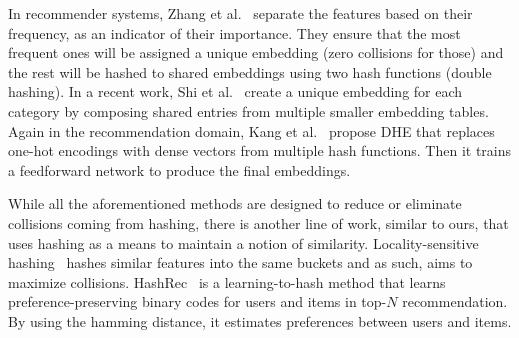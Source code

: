 \documentclass[conference]{IEEEtran}
\begin{document}
In recommender systems, Zhang et al.~\cite{zhang2020model} separate the features based on their frequency, as an indicator of their importance. They ensure that the most frequent ones will be assigned a unique embedding (zero collisions for those) and the rest will be hashed to shared embeddings using two hash functions (double hashing).  
In a recent work, Shi et al.~\cite{shi2020compositional} create a unique embedding for each category by composing shared entries from multiple smaller embedding tables.
% 
Again in the recommendation domain, Kang et al.~\cite{kang2020deep} propose DHE that replaces one-hot encodings with dense vectors from multiple hash functions. Then it trains a feedforward network to produce the final embeddings.

While all the aforementioned methods are designed to reduce or eliminate collisions coming from hashing, there is another line of work, similar to ours, that uses hashing as a means to maintain a notion of similarity. 
Locality-sensitive hashing~\cite{datar2004locality} hashes similar features into the same buckets and as such, aims to maximize collisions.
HashRec~\cite{kang2019candidate} is a learning-to-hash method that learns preference-preserving binary codes for users and items in top-$N$ recommendation. By using the hamming distance, it estimates preferences between users and items.



\end{document}
